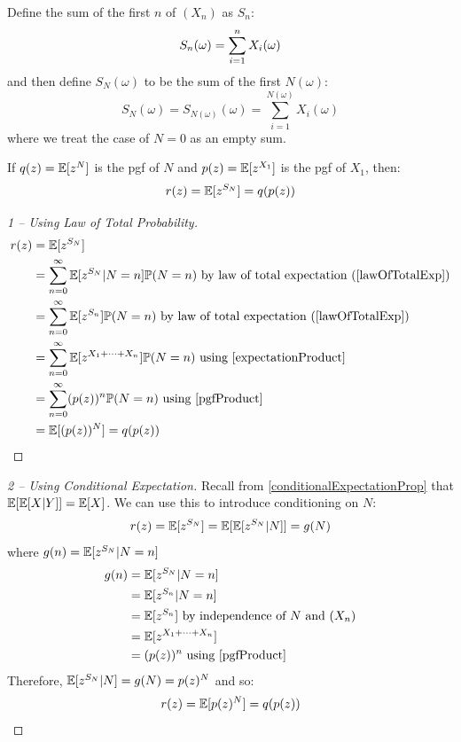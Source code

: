 \documentclass[../main.tex]{subfiles}
\begin{document}
Define the sum of the first $n$ of $(X_n)$ as $S_n$:
\[
  S_n(\omega) = \sum_{i = 1}^{n} X_i(\omega) \\
\]
and then define $S_N(\omega)$ to be the sum of the first $N(\omega)$:
\[
  S_N(\omega) = S_{N(\omega)}(\omega) = \sum_{i = 1}^{N(\omega)} X_i(\omega)
\]
where we treat the case of $N = 0$ as an empty sum.
\begin{lemma}
  If $q(z) = \mathbb{E}[z^{N}]$ is the pgf of $N$ and $p(z) = \mathbb{E}[z^{X_1}]$ is the pgf of $X_1$, then:
  \[
    r(z) = \mathbb{E}[z^{S_N}] = q(p(z))
  \]
\end{lemma}
\begin{proof}[1 -- Using Law of Total Probability]
  \begin{align*}
    r(z) &= \E[z^{S_N}] \\
         &= \sum_{n = 0}^{\infty} \E[z^{S_N} \vert N = n] \P(N = n) \text{ by law of total expectation (\cref{lawOfTotalExp})} \\
         &= \sum_{n = 0}^{\infty} \E[z^{S_n}] \P(N = n) \text{ by law of total expectation (\cref{lawOfTotalExp})} \\
         &= \sum_{n = 0}^{\infty} \E[z^{X_1 + \cdots + X_n}] \P(N = n) \text{ using \cref{expectationProduct}} \\
         &= \sum_{n = 0}^{\infty} (p(z))^{n} \P(N = n) \text{ using \cref{pgfProduct}} \\
         &= \E[(p(z))^{N}] = q(p(z))
  \end{align*}
\end{proof}
\begin{proof}[2 -- Using Conditional Expectation]\par
  Recall from \cref{conditionalExpectationProp} that $\mathbb{E}[\mathbb{E}[X \vert Y]] = \mathbb{E}[X]$.
  We can use this to introduce conditioning on $N$:
  \[
    r(z) = \mathbb{E}[z^{S_N}] = \mathbb{E}[\mathbb{E}[z^{S_N} \vert N]] = g(N)
  \]
  where $g(n) = \mathbb{E}[z^{S_N} \vert N = n]$
  \begin{align*}
    g(n) &= \E[z^{S_N} \vert N = n] \\
         &= \E[z^{S_n} \vert N = n] \\
         &= \E[z^{S_n}] \text{ by independence of $N$ and $(X_n)$} \\
         &= \E[z^{X_1 + \cdots + X_n}] \\
         &= (p(z))^{n} \text{ using \cref{pgfProduct}}
  \end{align*}
  Therefore, $\mathbb{E}[z^{S_N} \vert N] = g(N) = p(z)^{N}$ and so:
  \[
    r(z) = \mathbb{E}[p(z)^{N}] = q(p(z))
  \]
\end{proof}
\end{document}
